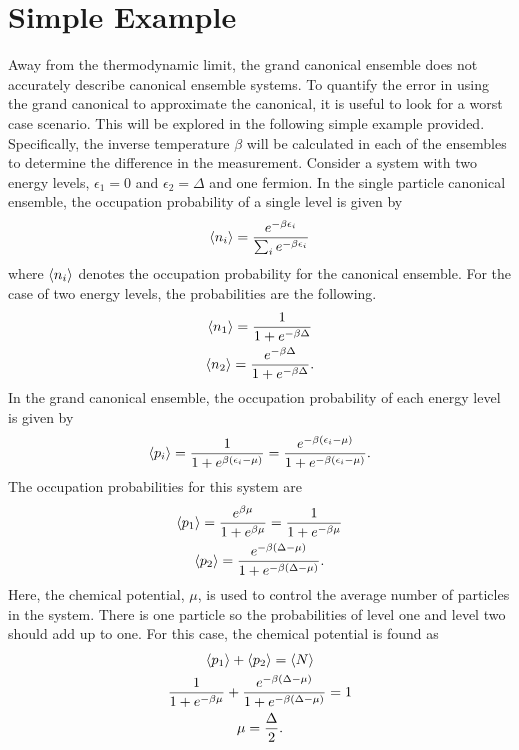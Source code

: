 \section{Simple Example}
Away from the thermodynamic limit, the grand canonical ensemble does not accurately describe canonical ensemble systems. To quantify the error in using the grand canonical to approximate the canonical, it is useful to look for a worst case scenario. This will be explored in the following simple example provided. Specifically, the inverse temperature $\beta$ will be calculated in each of the ensembles to determine the difference in the measurement. Consider a system with two energy levels, $\epsilon_1=0$ and $\epsilon_2=\Delta$ and one fermion. In the single particle canonical ensemble, the occupation probability of a single level is given by
\begin{equation}
    \left<{n_i}\right>=\frac{e^{-\beta\epsilon_i}}{\sum_i e^{-\beta\epsilon_i}}
\end{equation}
where $\left<{n_i}\right>$ denotes the occupation probability for the canonical ensemble. 
For the case of two energy levels, the probabilities are the following.
\begin{gather}
    \left<{n_1}\right>=\frac{1}{1+e^{-\beta\Delta}}\\
    \left<{n_2}\right>=\frac{e^{-\beta\Delta}}{1+e^{-\beta\Delta}}.
\end{gather}
In the grand canonical ensemble, the occupation probability of each energy level is given by 
\begin{equation}
    \left<{p_i}\right>=\frac{1}{1+e^{\beta(\epsilon_i-\mu)}}=\frac{e^{-\beta(\epsilon_i-\mu )}}{1+e^{-\beta(\epsilon_i-\mu)}}.
\end{equation}
The occupation probabilities for this system are 
\begin{gather}
    \left<{p_1}\right>=\frac{e^{\beta\mu}}{1+e^{\beta\mu}}=\frac{1}{1+e^{-\beta\mu}}\\
    \left<{p_2}\right>=\frac{e^{-\beta(\Delta-\mu)}}{1+ e^{-\beta(\Delta-\mu)}}.
\end{gather}
Here, the chemical potential, $\mu$, is used to control the average number of particles in the system. There is one particle so the probabilities of level one and level two should add up to one. For this case, the chemical potential is found as 
\begin{gather}
    \left<{p_1}\right>+\left<{p_2}\right>=\left<{N}\right>\nonumber\\
    \frac{1}{1+e^{-\beta\mu}}+\frac{e^{-\beta(\Delta-\mu)}}{1+e^{-\beta(\Delta-\mu)}}=1\nonumber\\
    \mu=\frac{\Delta}{2}.
\end{gather}
